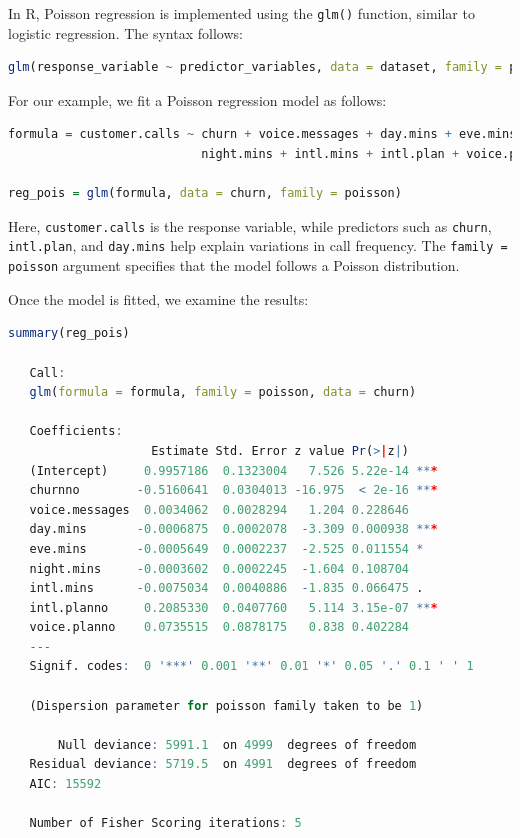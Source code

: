 \documentclass[
]{book}
\newcommand{\passthrough}[1]{#1}
\theoremstyle{definition}
\theoremstyle{definition}
\theoremstyle{definition}
\theoremstyle{definition}
\theoremstyle{remark}
\begin{document}
In R, Poisson regression is implemented using the \passthrough{\lstinline!glm()!} function, similar to logistic regression. The syntax follows:

\begin{lstlisting}[language=R]
glm(response_variable ~ predictor_variables, data = dataset, family = poisson)
\end{lstlisting}

For our example, we fit a Poisson regression model as follows:

\begin{lstlisting}[language=R]
formula = customer.calls ~ churn + voice.messages + day.mins + eve.mins + 
                           night.mins + intl.mins + intl.plan + voice.plan

reg_pois = glm(formula, data = churn, family = poisson)
\end{lstlisting}

Here, \passthrough{\lstinline!customer.calls!} is the response variable, while predictors such as \passthrough{\lstinline!churn!}, \passthrough{\lstinline!intl.plan!}, and \passthrough{\lstinline!day.mins!} help explain variations in call frequency. The \passthrough{\lstinline!family = poisson!} argument specifies that the model follows a Poisson distribution.

Once the model is fitted, we examine the results:

\begin{lstlisting}[language=R]
summary(reg_pois)
   
   Call:
   glm(formula = formula, family = poisson, data = churn)
   
   Coefficients:
                    Estimate Std. Error z value Pr(>|z|)    
   (Intercept)     0.9957186  0.1323004   7.526 5.22e-14 ***
   churnno        -0.5160641  0.0304013 -16.975  < 2e-16 ***
   voice.messages  0.0034062  0.0028294   1.204 0.228646    
   day.mins       -0.0006875  0.0002078  -3.309 0.000938 ***
   eve.mins       -0.0005649  0.0002237  -2.525 0.011554 *  
   night.mins     -0.0003602  0.0002245  -1.604 0.108704    
   intl.mins      -0.0075034  0.0040886  -1.835 0.066475 .  
   intl.planno     0.2085330  0.0407760   5.114 3.15e-07 ***
   voice.planno    0.0735515  0.0878175   0.838 0.402284    
   ---
   Signif. codes:  0 '***' 0.001 '**' 0.01 '*' 0.05 '.' 0.1 ' ' 1
   
   (Dispersion parameter for poisson family taken to be 1)
   
       Null deviance: 5991.1  on 4999  degrees of freedom
   Residual deviance: 5719.5  on 4991  degrees of freedom
   AIC: 15592
   
   Number of Fisher Scoring iterations: 5
\end{lstlisting}
\end{document}
